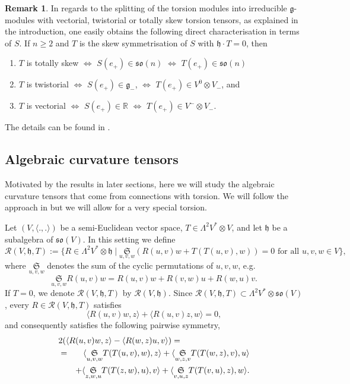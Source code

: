 \documentclass[11pt,a4paper]{amsart}
\newcommand{\g}{\mathfrak{g}}
\newcommand{\h}{\mathfrak{h}}
\newcommand{\+}{\oplus}
\newcommand{\so}{\mathfrak{so}}
\newcommand{\1}{\mathbf{1}}
\newcommand{\R}{\mathbb{R}} %
\newcommand{\<}{\langle}
\renewcommand{\>}{\rangle}
\theoremstyle{definition}
\newtheorem{remark}[definition]{Remark}
\theoremstyle{plain}
\numberwithin{equation}{section}
\begin{document}
\begin{remark}
In regards to the splitting of the torsion modules into irreducible $\g$-modules with vectorial, twistorial or totally skew torsion tensors, as explained in the introduction, one easily obtains the following direct characterisation in terms of $S$. If $n\ge 2$ and $T$ is the skew symmetrisation of $S$ with  $\h\cdot T=0$, then 
\begin{enumerate}
\item $T$ is totally skew $\iff$ $S(e_+)\in \so(n)$  $\iff$ $T(e_+)\in \so(n)$ 
\item $T$ is  twistorial $\iff$ $S(e_+)\in \g_-$,  $\iff$ $T(e_+)\in V^0\otimes V_-$, and
\item $T$ is vectorial $\iff$ $S(e_+)\in \R$ $\iff$ $T(e_+)\in V^-\otimes V_-$. 
\end{enumerate}
The details can be found in \cite{steven-thesis}.
\end{remark}




\subsection{Algebraic curvature tensors}
\label{curvsec}
Motivated by the results in later sections, here we will study the algebraic curvature tensors that come from connections with torsion. We will follow the approach in \cite{galaev03} but we will allow for a very special torsion.

Let $(V,\<.,.\>)$ be a semi-Euclidean vector space,  $T\in \Lambda^2V^* \otimes V$, and let $\h$ be a subalgebra of $\so(V)$. In this setting we define
\[
\mathcal R(V,\h,T):= \{ R\in \Lambda^2V^*\otimes \h\mid \underset{u,v,w}{\mathfrak{S}}    \left( R(u,v)w +T(T(u,v),w)\right)=0\text{ for all }u,v,w\in V\},\]
where $\underset{u,v,w}{\mathfrak{S}}   $ denotes the sum of the cyclic permutations of $u,v,w$, e.g.\[\underset{u,v,w}{\mathfrak{S}} R(u,v)w= R(u,v)w+ R(v,w)u+ R(w,u)v.\]
If $T=0$, we denote $\mathcal R(V,\h,T)$ by $\mathcal R(V,\h)$.
Since $ \mathcal R (V,\h,T)\subset \Lambda^2V^*\otimes \so(V)$, every $R\in  \mathcal R (V,\h,T)$ satisfies
\[\< R(u,v)w,z\>+\<R(u,v)z,w\>=0, \] and 
consequently
satisfies the following pairwise symmetry, 
\begin{eqnarray} 
\lefteqn{2(\< R(u,v)w,z\>-\< R(w,z)u,v\>)=\nonumber}
\\
&=&\label{pair}
\< \underset{u,v,w}{\mathfrak{S}}   T(T(u,v),w),z\>+\< \underset{w,z,v}{\mathfrak{S}} T(T(w,z),v),u\> 
\\
&&\nonumber
+\< \underset{z,w,u}{\mathfrak{S}} T(T(z,w),u),v\>+\< \underset{v,u,z}{\mathfrak{S}} T(T(v,u),z),w\>.
\end{eqnarray}
\end{document}
